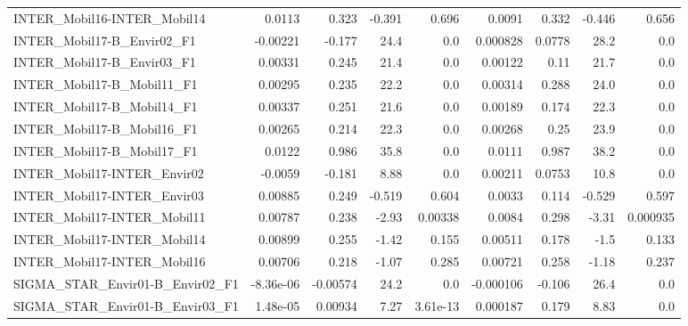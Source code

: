 \begin{tabular}{lrrrrrrrr}
INTER\_Mobil16-INTER\_Mobil14               &      0.0113 &        0.323 &  -0.391 &    0.696 &     0.0091 &       0.332 &       -0.446 &         0.656 \\
INTER\_Mobil17-B\_Envir02\_F1                &    -0.00221 &       -0.177 &    24.4 &      0.0 &   0.000828 &      0.0778 &         28.2 &           0.0 \\
INTER\_Mobil17-B\_Envir03\_F1                &     0.00331 &        0.245 &    21.4 &      0.0 &    0.00122 &        0.11 &         21.7 &           0.0 \\
INTER\_Mobil17-B\_Mobil11\_F1                &     0.00295 &        0.235 &    22.2 &      0.0 &    0.00314 &       0.288 &         24.0 &           0.0 \\
INTER\_Mobil17-B\_Mobil14\_F1                &     0.00337 &        0.251 &    21.6 &      0.0 &    0.00189 &       0.174 &         22.3 &           0.0 \\
INTER\_Mobil17-B\_Mobil16\_F1                &     0.00265 &        0.214 &    22.3 &      0.0 &    0.00268 &        0.25 &         23.9 &           0.0 \\
INTER\_Mobil17-B\_Mobil17\_F1                &      0.0122 &        0.986 &    35.8 &      0.0 &     0.0111 &       0.987 &         38.2 &           0.0 \\
INTER\_Mobil17-INTER\_Envir02               &     -0.0059 &       -0.181 &    8.88 &      0.0 &    0.00211 &      0.0753 &         10.8 &           0.0 \\
INTER\_Mobil17-INTER\_Envir03               &     0.00885 &        0.249 &  -0.519 &    0.604 &     0.0033 &       0.114 &       -0.529 &         0.597 \\
INTER\_Mobil17-INTER\_Mobil11               &     0.00787 &        0.238 &   -2.93 &  0.00338 &     0.0084 &       0.298 &        -3.31 &      0.000935 \\
INTER\_Mobil17-INTER\_Mobil14               &     0.00899 &        0.255 &   -1.42 &    0.155 &    0.00511 &       0.178 &         -1.5 &         0.133 \\
INTER\_Mobil17-INTER\_Mobil16               &     0.00706 &        0.218 &   -1.07 &    0.285 &    0.00721 &       0.258 &        -1.18 &         0.237 \\
SIGMA\_STAR\_Envir01-B\_Envir02\_F1           &   -8.36e-06 &     -0.00574 &    24.2 &      0.0 &  -0.000106 &      -0.106 &         26.4 &           0.0 \\
SIGMA\_STAR\_Envir01-B\_Envir03\_F1           &    1.48e-05 &      0.00934 &    7.27 & 3.61e-13 &   0.000187 &       0.179 &         8.83 &           0.0 \\

\end{tabular}
